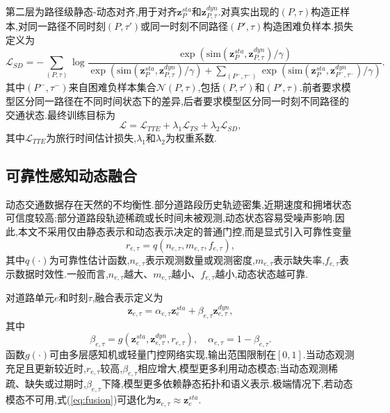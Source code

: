 \documentclass{rjthesis}
\begin{document}
第二层为路径级静态-动态对齐,用于对齐$\mathbf{z}^{sta}_{P}$和$\mathbf{z}^{dyn}_{P,\tau}$.对真实出现的$(P,\tau)$构造正样本,对同一路径不同时刻$(P,\tau')$或同一时刻不同路径$(P',\tau)$构造困难负样本.损失定义为
\begin{equation}
	\mathcal{L}_{SD}
	=-\sum_{(P,\tau)}
	\log
	\frac{\exp(\mathrm{sim}(\mathbf{z}^{sta}_{P},\mathbf{z}^{dyn}_{P,\tau})/\gamma)}
	{\exp(\mathrm{sim}(\mathbf{z}^{sta}_{P},\mathbf{z}^{dyn}_{P,\tau})/\gamma)+
	\sum_{(P^-,\tau^-)}\exp(\mathrm{sim}(\mathbf{z}^{sta}_{P},\mathbf{z}^{dyn}_{P^-,\tau^-})/\gamma)}.
\end{equation}
其中$(P^-,\tau^-)$来自困难负样本集合$\mathcal{N}(P,\tau)$,包括$(P,\tau')$和$(P',\tau)$.前者要求模型区分同一路径在不同时间状态下的差异,后者要求模型区分同一时刻不同路径的交通状态.最终训练目标为
\begin{equation}
	\mathcal{L}=\mathcal{L}_{TTE}+\lambda_1\mathcal{L}_{TS}+\lambda_2\mathcal{L}_{SD},
\end{equation}
其中$\mathcal{L}_{TTE}$为旅行时间估计损失,$\lambda_1$和$\lambda_2$为权重系数.

\subsection{可靠性感知动态融合}

动态交通数据存在天然的不均衡性.部分道路段历史轨迹密集,近期速度和拥堵状态可信度较高;部分道路段轨迹稀疏或长时间未被观测,动态状态容易受噪声影响.因此,本文不采用仅由静态表示和动态表示决定的普通门控,而是显式引入可靠性变量
\begin{equation}
	r_{e,\tau}=q(n_{e,\tau},m_{e,\tau},f_{e,\tau}),
\end{equation}
其中$q(\cdot)$为可靠性估计函数,$n_{e,\tau}$表示观测数量或观测密度,$m_{e,\tau}$表示缺失率,$f_{e,\tau}$表示数据时效性.一般而言,$n_{e,\tau}$越大、$m_{e,\tau}$越小、$f_{e,\tau}$越小,动态状态越可靠.

对道路单元$e$和时刻$\tau$,融合表示定义为
\begin{equation}
	\mathbf{z}_{e,\tau}=\alpha_{e,\tau}\mathbf{z}^{sta}_{e}+\beta_{e,\tau}\mathbf{z}^{dyn}_{e,\tau},
	\label{eq:fusion}
\end{equation}
其中
\begin{equation}
	\beta_{e,\tau}=g(\mathbf{z}^{sta}_{e},\mathbf{z}^{dyn}_{e,\tau},r_{e,\tau}),\quad
	\alpha_{e,\tau}=1-\beta_{e,\tau}.
\end{equation}
函数$g(\cdot)$可由多层感知机或轻量门控网络实现,输出范围限制在$[0,1]$.当动态观测充足且更新较近时,$r_{e,\tau}$较高,$\beta_{e,\tau}$相应增大,模型更多利用动态模态;当动态观测稀疏、缺失或过期时,$\beta_{e,\tau}$下降,模型更多依赖静态拓扑和语义表示.极端情况下,若动态模态不可用,式(\ref{eq:fusion})可退化为$\mathbf{z}_{e,\tau}\approx\mathbf{z}^{sta}_{e}$.
\end{document}
